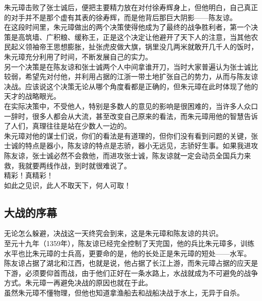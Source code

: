 	\begin{multicols}{\theparacolNo}
\fi
朱元璋击败了张士诚后，便把主要精力放在对付徐寿辉身上，但他明白，自己真正的对手并不是那个虚有其表的徐寿辉，而是他背后那巨大阴影——陈友谅。\\

在这段时间里，朱元璋做出的两个决策使得他成为了最终的战争胜利者，第一个决策是高筑墙、广积粮、缓称王，正是这个决定让他避开了天下人的注意，当其他农民起义领袖帝王思想膨胀，扯张虎皮做大旗，锅里没几两米就敢开几千人的饭时，朱元璋充分利用了时间，不断发展自己的实力。\\

另一个决策是在陈友谅和张士诚两个人中间拿谁开刀，当时大家普遍认为张士诚比较弱，希望先对付他，并利用占据的江浙一带土地扩张自己的势力，从而与陈友谅决战。应该说这个决策无论从哪个角度看都是正确的，但朱元璋在此时体现了他的天才的战略眼光。\\

在实际决策中，不受他人，特别是多数人的意见的影响是很困难的，当许多人众口一辞时，很多人都会从大流，甚至改变自己原来的看法，而朱元璋用他的智慧告诉了人们，真理往往是站在少数人一边的。\\

朱元璋对他的谋士们说，你们的看法是有道理的，但你们没有看到问题的关键，张士诚的特点是器小，陈友谅的特点是志骄，器小无远见，志骄好生事。如果我进攻陈友谅，张士诚必然不会救他，而进攻张士诚，陈友谅就一定会动员全国兵力来救，我就要两线作战，到时就很难说了。\\

精彩！真精彩！\\

如此之见识，此人不取天下，何人可取！\\

\subsection{大战的序幕}
无论怎么躲避，决战这一天终究会到来，这是朱元璋和陈友谅的共识。\\

至元十九年（1359年），陈友谅已经完全控制了天完国，他的兵比朱元璋多，训练水平也比朱元璋的士兵高，更要命的是，他的长处正是朱元璋的短处——水军。\\

陈友谅占据了湖北和江西，也就是说，他占据了长江上游，而朱元璋占据的应天是下游，必须要仰首而战，由于他们正好在一条水路上，水战就成为不可避免的战争方式。朱元璋一再避免决战的原因也就在于此。\\

虽然朱元璋不懂物理，但他也知道拿渔船去和战船决战于水上，无异于自杀。\\


\end{multicols}
